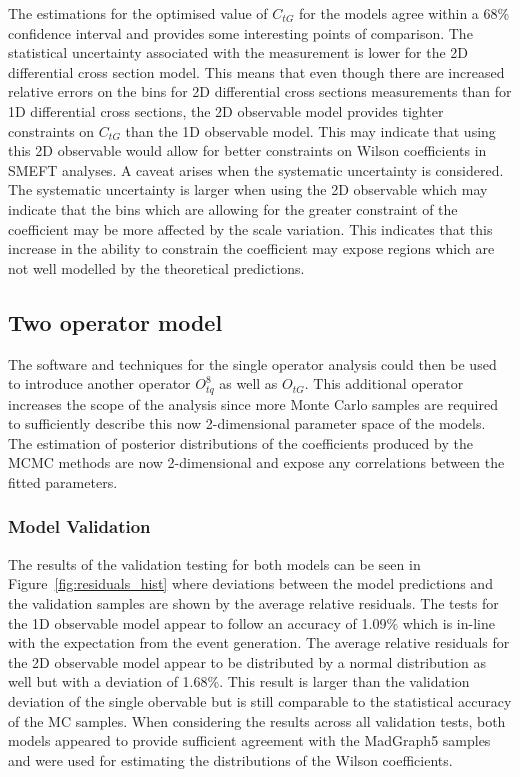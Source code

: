 \documentclass[a4paper,11pt]{article}
\begin{document}
The estimations for the optimised value of $C_{tG}$ for the models agree within a 68\% confidence interval and provides some interesting points of comparison.
The statistical uncertainty associated with the measurement is lower for the 2D differential cross section model.
This means that even though there are increased relative errors on the bins for 2D differential cross sections measurements than for 1D differential cross sections, the 2D observable model provides tighter constraints on $C_{tG}$ than the 1D observable model.
This may indicate that using this 2D observable would allow for better constraints on Wilson coefficients in SMEFT analyses.
A caveat arises when the systematic uncertainty is considered.
The systematic uncertainty is larger when using the 2D observable which may indicate that the bins which are allowing for the greater constraint of the coefficient may be more affected by the scale variation.
This indicates that this increase in the ability to constrain the coefficient may expose regions which are not well modelled by the theoretical predictions.

\subsection{Two operator model}\label{sec:analysis_two_op}

The software and techniques for the single operator analysis could then be used to introduce another operator $O_{tq}^{8}$ as well as $O_{tG}$.
This additional operator increases the scope of the analysis since more Monte Carlo samples are required to sufficiently describe this now 2-dimensional parameter space of the models.
The estimation of posterior distributions of the coefficients produced by the MCMC methods are now 2-dimensional and expose any correlations between the fitted parameters.

\subsubsection{Model Validation}

The results of the validation testing for both models can be seen in Figure~\ref{fig:residuals_hist} where deviations between the model predictions and the validation samples are shown by the average relative residuals.
The tests for the 1D observable model appear to follow an accuracy of 1.09\% which is in-line with the expectation from the event generation.
The average relative residuals for the 2D observable model appear to be distributed by a normal distribution as well but with a deviation of 1.68\%.
This result is larger than the validation deviation of the single obervable but is still comparable to the statistical accuracy of the MC samples.
When considering the results across all validation tests, both models appeared to provide sufficient agreement with the MadGraph5 samples and were used for estimating the distributions of the Wilson coefficients.
\end{document}
